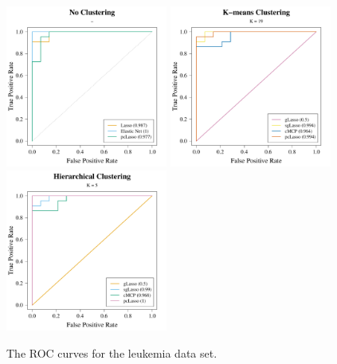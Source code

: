 \documentclass[11pt]{article}
\begin{document}
{\begin{landscape}
\begin{table}[p]
\end{table}

\vspace{0.5cm}

\begin{figure}[p]
    \centering
    \includegraphics[width = 0.475\textwidth]{leuk_ROC_no_n.pdf}
    \includegraphics[width = 0.475\textwidth]{leuk_ROC_k_n.pdf}
    \includegraphics[width = 0.475\textwidth]{leuk_ROC_h_n.pdf}
    \caption{The ROC curves for the leukemia data set.}
    \label{leuk_ROC}
\end{figure}

\end{landscape}
}

\lipsum[3-7]
\end{document}
